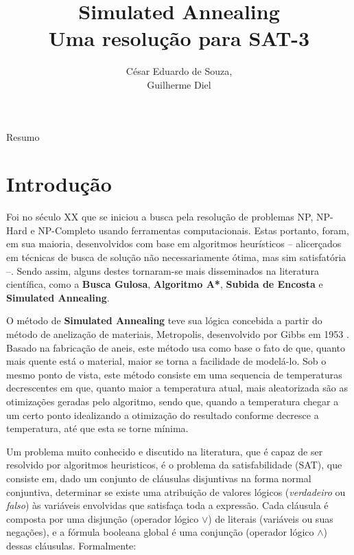 \documentclass[12pt]{article}
\title{Simulated Annealing\\ Uma resolução para SAT-3}
\author{César Eduardo de Souza\inst{1},\\ Guilherme Diel\inst{1}}
\begin{document}
 

\maketitle

     
\begin{resumo} 
  Resumo
\end{resumo}


\section{Introdução}
\label{sec:introducao}

Foi no século XX que se iniciou a busca pela resolução de problemas NP, NP-Hard e NP-Completo usando ferramentas computacionais. 
%
Estas portanto, foram, em sua maioria, desenvolvidos com base em algoritmos heurísticos – alicerçados em técnicas de busca de solução não necessariamente ótima, mas sim satisfatória –. 
%
Sendo assim, alguns destes tornaram-se mais disseminados na literatura científica, como a \textbf{Busca Gulosa}, \textbf{Algoritmo A*}, \textbf{Subida de Encosta} e \textbf{Simulated Annealing}. 

O método de \textbf{Simulated Annealing} teve sua lógica concebida a partir do método de anelização de materiais, Metropolis, desenvolvido por Gibbs em 1953 \cite{Gibbs}.
%
Basado na fabricação de aneis, este método usa como base o fato de que, quanto mais quente está o material, maior se torna a facilidade de modelá-lo.
%
Sob o mesmo ponto de vista, este método consiste em uma sequencia de temperaturas decrescentes em que, quanto maior a temperatura atual, mais aleatorizada são as otimizações geradas pelo algoritmo, sendo que, quando a temperatura chegar a um certo ponto idealizando a otimização do resultado conforme decresce a temperatura, até que esta se torne mínima.

Um problema muito conhecido e discutido na literatura, que é capaz de ser resolvido por algoritmos heuristicos, é o problema da satisfabilidade (SAT), que consiste em, dado um conjunto de cláusulas disjuntivas na forma normal conjuntiva, determinar se existe uma atribuição de valores lógicos (\textit{verdadeiro} ou \textit{falso}) às variáveis envolvidas que satisfaça toda a expressão.
%
Cada cláusula é composta por uma disjunção (operador lógico $\lor$) de literais (variáveis ou suas negações), e a fórmula booleana global é uma conjunção (operador lógico $\land$) dessas cláusulas. Formalmente:
\end{document}
